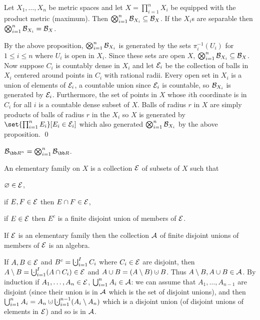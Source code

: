 \bprop

    Let $X_1,\dots,X_n$ be metric spaces and let $X=\prod_{i=1}^n X_i$ be equipped with the product metric (maximum).
    Then $\bigotimes_{i=1}^n{\cal B}_{X_i}\subseteq{\cal B}_X$.
    If the $X_i$s are separable then $\bigotimes_{i=1}^n{\cal B}_{X_i}={\cal B}_X$.

\eprop

By the above proposition, $\bigotimes_{i=1}^n{\cal B}_{X_i}$ is generated by the sets $\pi^{-1}_i(U_i)$ for $1\leq i\leq n$ where $U_i$ is open in $X_i$.
Since these sets are open $X$, $\bigotimes_{i=1}^n{\cal B}_{X_i}\subseteq{\cal B}_X$.
Now suppose $C_i$ is countably dense in $X_i$ and let ${\cal E}_i$ be the collection of balls in $X_i$ centered around points in $C_i$ with rational radii.
Every open set in $X_i$ is a union of elements of ${\cal E}_i$, a countable union since ${\cal E}_i$ is countable, so ${\cal B}_{X_i}$ is generated by ${\cal E}_i$.
Furthermore, the set of points in $X$ whose $i$th coordinate is in $C_i$ for all $i$ is a countable dense subset of $X$.
Balls of radius $r$ in $X$ are simply products of balls of radius $r$ in the $X_i$ so $X$ is generated by $\set{\prod_{i=1}^nE_i}[E_i\in{\cal E}_i]$ which also generated $\bigotimes_{i=1}^n{\cal B}_{X_i}$
by the above proposition.
\qed

\bcoro

    ${\cal B}_{{\bb R}^n}=\bigotimes_{i=1}^n{\cal B}_{\bb R}$.

\ecoro

\bdefn

    An {\emphcolor elementary family} on $X$ is a collection ${\cal E}$ of subsets of $X$ such that
    \benum
        \item $\varnothing\in{\cal E}$,
        \item if $E,F\in{\cal E}$ then $E\cap F\in{\cal E}$,
        \item if $E\in{\cal E}$ then $E^c$ is a finite disjoint union of members of ${\cal E}$.
    \eenum

\edefn

\bprop

    If ${\cal E}$ is an elementary family then the collection ${\cal A}$ of finite disjoint unions of members of ${\cal E}$ is an algebra.

\eprop

If $A,B\in{\cal E}$ and $B^c=\bigdcup_{i=1}^IC_i$ where $C_i\in{\cal E}$ are disjoint, then $A\setminus B=\bigdcup_{i=1}^I(A\cap C_i)\in{\cal E}$ and $A\cup B=(A\setminus B)\dcup B$.
Thus $A\setminus B,A\cup B\in{\cal A}$.
By induction if $A_1,\dots,A_n\in{\cal E}$, $\bigcup_{i=1}^nA_i\in{\cal A}$: we can assume that $A_1,\dots,A_{n-1}$ are disjoint (since their union is in ${\cal A}$ which is the set of disjoint unions),
and then $\bigcup_{i=1}^nA_i=A_n\dcup\bigdcup_{i=1}^{n-1}(A_i\setminus A_n)$ which is a disjoint union (of disjoint unions of elements in ${\cal E}$) and so is in ${\cal A}$.

